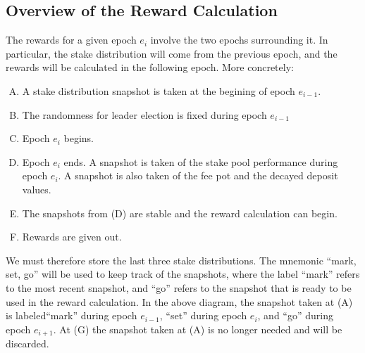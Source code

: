 \subsection{Overview of the Reward Calculation}
\label{sec:reward-overview}

The rewards for a given epoch $e_i$ involve the two epochs surrounding it.
In particular, the stake distribution will come from the previous epoch,
and the rewards will be calculated in the following epoch.
More concretely:
\begin{enumerate}[(A)]%
  \item A stake distribution snapshot is taken at the begining of epoch $e_{i-1}$.
  \item The randomness for leader election is fixed during epoch $e_{i-1}$
  \item Epoch $e_{i}$ begins.
  \item Epoch $e_{i}$ ends.
    A snapshot is taken of the stake pool performance during epoch $e_{i}$.
    A snapshot is also taken of the fee pot and the decayed deposit values.
  \item The snapshots from (D) are stable and the reward calculation can begin.
  \item Rewards are given out.
\end{enumerate}

\usetikzlibrary{decorations.pathreplacing}

We must therefore store the last three stake distributions.
The mnemonic ``mark, set, go'' will be used to keep
track of the snapshots, where the label ``mark'' refers to the most recent snapshot,
and ``go'' refers to the snapshot that is ready to be used in the reward calculation.
In the above diagram, the snapshot taken at (A) is labeled``mark'' during epoch $e_{i-1}$,
``set'' during epoch $e_i$, and ``go'' during epoch $e_{i+1}$. At (G) the snapshot
taken at (A) is no longer needed and will be discarded.

